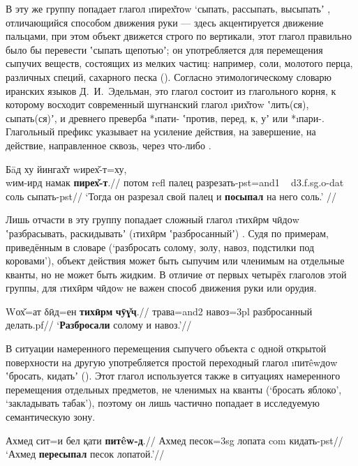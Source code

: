 В эту же группу попадает глагол \i{пирех̌тоw} ‘сыпать, рассыпать, высыпатьʼ \parencite[416]{karamshoev1991}, отличающийся способом движения руки — здесь акцентируется движение пальцами, при этом объект движется строго по вертикали, этот глагол правильно было бы перевести ʽсыпать щепотьюʼ; он употребляется для перемещения сыпучих веществ, состоящих из мелких частиц: например, соли, молотого перца, различных специй, сахарного песка (). Согласно этимологическому словарю иранских языков Д.~И.~Эдельман, это глагол состоит из глагольного корня, к которому восходит современный шугнанский глагол \i{рих̌тоw} ʽлить(ся), сыпать(ся)ʼ, и древнего преверба *\i{пати}- ʽпротив, перед, к, уʼ \parencite[243]{edelman2020_dict} или *\i{пари}-. Глагольный префикс указывает на усиление действия, на завершение, на действие, направленное сквозь, через что-либо \parencite[177]{edelman2020_dict}.

\begingl
\gla Бāд ху йингах̌т wирех̌-т=ху, ~~~~~~~~~~~~~~~~~~~~~~~~~~~~~~~~~~~~~~~~~~~ wим-ирд намак \textbf{пирех̌-т}.//
\glc потом {\sc refl} палец разрезать-{\sc pst=and1} ~ {\sc d3.f.sg.o-dat} соль сыпать-{\sc pst}//
\glft ‘Тогда он разрезал свой палец и \textbf{посыпал} на него соль.’ //
\endgl \xe

Лишь отчасти в эту группу попадает сложный глагол \i{тихӣрм чӣдоw} ʽразбрасывать, раскидыватьʼ (\i{тихӣрм} ʽразбросанныйʼ) \parencite[83]{karamshoev1999}. Судя по примерам, приведённым в словаре (‘разбросать солому, золу, навоз, подстилки под коровами’), объект действия может быть сыпучим или членимым на отдельные кванты, но не может быть жидким. В отличие от первых четырёх глаголов этой группы, для \i{тихӣрм чӣдоw} не важен способ движения руки или орудия.

\begingl
\gla Wох̌=ат δӣд=ен \textbf{тихӣрм} \textbf{чӯɣ̌ҷ}.//
\glc трава={\sc and2} навоз={\sc 3pl} разбросанный делать.{\sc pf}//
\glft ‘\textbf{Разбросали} солому и навоз.’//
\endgl \xe

В ситуации намеренного перемещения сыпучего объекта с одной открытой поверхности на другую употребляется простой переходный глагол \i{питêwдоw} ʽбросать, кидатьʼ \parencite[387–388]{karamshoev1991} (). Этот глагол используется также в ситуациях намеренного перемещения отдельных предметов, не членимых на кванты (‘бросать яблоко’, ‘закладывать табак’), поэтому он лишь частично попадает в исследуемую семантическую зону.

\begingl
\gla Ахмед сит=и бел қати \textbf{питêw-д}.//
\glc Ахмед песок={\sc 3sg} лопата {\sc com} кидать-{\sc pst}//
\glft ‘Ахмед \textbf{пересыпал} песок лопатой.’//
\endgl \xe

